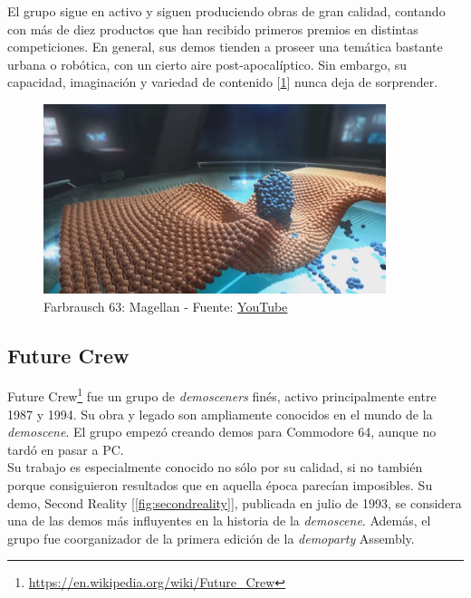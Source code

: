 El grupo sigue en activo y siguen produciendo obras de gran calidad, contando con más de diez productos que han recibido primeros premios en distintas competiciones. En general, sus demos tienden a proseer una temática bastante urbana o robótica, con un cierto aire post-apocalíptico.
Sin embargo, su capacidad, imaginación y variedad de contenido [\ref{fig:magellan}] nunca deja de sorprender.

\begin{figure}[h]
	\centering
	\includegraphics[width=10cm]{archivos/fr-063-magellan}
	\caption{Farbrausch 63: Magellan - Fuente: \href{https://www.youtube.com/watch?v=2Vguvli1Y0k}{YouTube}}
	\label{fig:magellan}
\end{figure}

\subsection{Future Crew}

Future Crew\footnote{\url{https://en.wikipedia.org/wiki/Future_Crew}} fue un grupo de \emph{demosceners} finés, activo principalmente entre 1987 y 1994. Su obra y legado son ampliamente conocidos en el mundo de la \emph{demoscene}. El grupo empezó creando demos para Commodore 64, aunque no tardó en pasar a PC.\\

Su trabajo es especialmente conocido no sólo por su calidad, si no también porque consiguieron resultados que en aquella época parecían imposibles. Su demo, Second Reality [\ref{fig:secondreality}], publicada en julio de 1993, se considera una de las demos más influyentes en la historia de la \emph{demoscene}. Además, el grupo fue coorganizador de la primera edición de la \emph{demoparty} Assembly.\\

